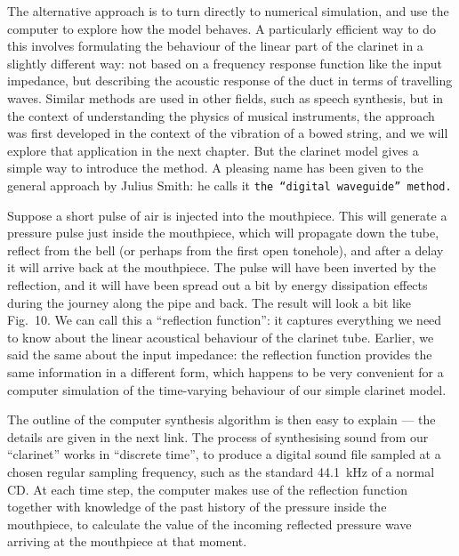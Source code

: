   The alternative approach is to turn directly to numerical simulation, and use 
  the computer to explore how the model behaves. A particularly efficient way 
  to do this involves formulating the behaviour of the linear part of the 
  clarinet in a slightly different way: not based on a frequency response 
  function like the input impedance, but describing the acoustic response of 
  the duct in terms of travelling waves. Similar methods are used in other 
  fields, such as speech synthesis, but in the context of understanding the 
  physics of musical instruments, the approach was first developed in the 
  context of the vibration of a bowed string, and we will explore that 
  application in the next chapter. But the clarinet model gives a simple way to 
  introduce the method. A pleasing name has been given to the general approach 
  by Julius Smith: he calls it \tt{}the “digital waveguide” method\rm{}. 

  Suppose a short pulse of air is injected into the mouthpiece. This will 
  generate a pressure pulse just inside the mouthpiece, which will propagate 
  down the tube, reflect from the bell (or perhaps from the first open 
  tonehole), and after a delay it will arrive back at the mouthpiece. The pulse 
  will have been inverted by the reflection, and it will have been spread out a 
  bit by energy dissipation effects during the journey along the pipe and back. 
  The result will look a bit like Fig.\ 10. We can call this a “reflection 
  function”: it captures everything we need to know about the linear acoustical 
  behaviour of the clarinet tube. Earlier, we said the same about the input 
  impedance: the reflection function provides the same information in a 
  different form, which happens to be very convenient for a computer simulation 
  of the time-varying behaviour of our simple clarinet model. 


  The outline of the computer synthesis algorithm is then easy to explain — the 
  details are given in the next link. The process of synthesising sound from 
  our “clarinet” works in “discrete time”, to produce a digital sound file 
  sampled at a chosen regular sampling frequency, such as the standard 44.1~kHz 
  of a normal CD. At each time step, the computer makes use of the reflection 
  function together with knowledge of the past history of the pressure inside 
  the mouthpiece, to calculate the value of the incoming reflected pressure 
  wave arriving at the mouthpiece at that moment. 


